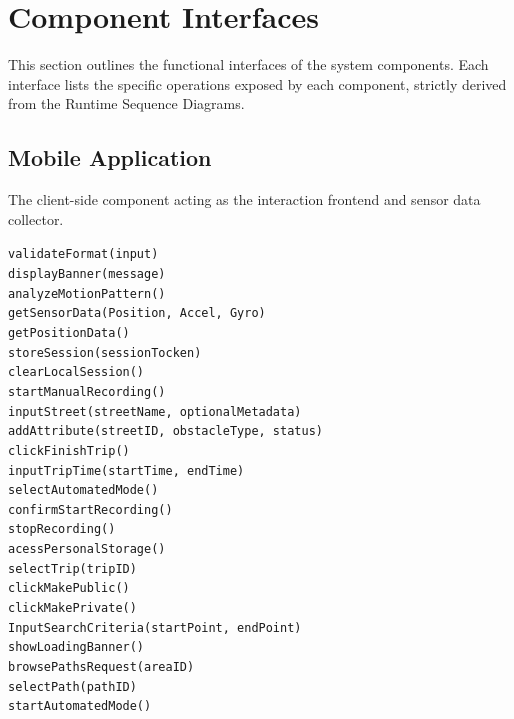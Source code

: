 \section{Component Interfaces}

This section outlines the functional interfaces of the system components. Each interface lists the specific operations exposed by each component, strictly derived from the Runtime Sequence Diagrams.

\subsection{Mobile Application}
The client-side component acting as the interaction frontend and sensor data collector.

        \texttt{validateFormat(input)}\\
        \texttt{displayBanner(message)}\\
        \texttt{analyzeMotionPattern()}\\
        \texttt{getSensorData(Position, Accel, Gyro)}\\
        \texttt{getPositionData()}\\
        \texttt{storeSession(sessionTocken)}\\
        \texttt{clearLocalSession()}\\
        \texttt{startManualRecording()}\\
        \texttt{inputStreet(streetName, optionalMetadata)}\\
        \texttt{addAttribute(streetID, obstacleType, status)}\\
        \texttt{clickFinishTrip()}\\
        \texttt{inputTripTime(startTime, endTime)}\\
        \texttt{selectAutomatedMode()}\\
        \texttt{confirmStartRecording()}\\
        \texttt{stopRecording()}\\
        \texttt{acessPersonalStorage()}\\
        \texttt{selectTrip(tripID)}\\
        \texttt{clickMakePublic()}\\
        \texttt{clickMakePrivate()}\\
        \texttt{InputSearchCriteria(startPoint, endPoint)}\\
        \texttt{showLoadingBanner()}\\
        \texttt{browsePathsRequest(areaID)}\\
        \texttt{selectPath(pathID)}\\
        \texttt{startAutomatedMode()}\\




